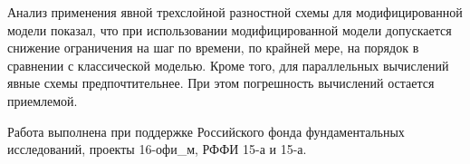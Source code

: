 Анализ применения явной трехслойной разностной
схемы для модифицированной модели показал, что при использовании модифицированной
модели допускается снижение ограничения на шаг по времени, по крайней мере, на порядок
в сравнении с классической моделью. Кроме того, для параллельных вычислений явные схемы предпочтительнее.
При этом погрешность вычислений остается приемлемой. 

Работа выполнена при поддержке Российского фонда фундаментальных исследований,
проекты 16\--офи\_м, РФФИ 15\--а и 15\--а.